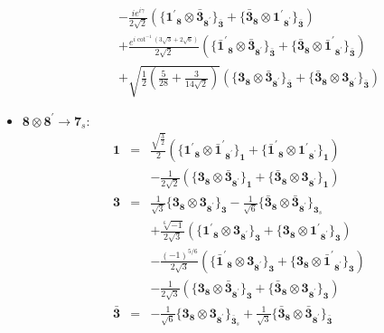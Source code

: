 \documentclass[english]{article}
\newcommand{\subcg}[3]{\big\{ {#1}\otimes{#2}\big\}^{}_{#3}}
\newcommand{\rep}[1]{\mathbf{#1}}
\begin{document}
\begin{itemize}
\begin{eqnarray*}
 & & -\frac{i e^{i \gamma }}{2 \sqrt{2}}\left(\subcg{\rep{1^{\prime}}_{\rep{8}}}{\rep{\bar{3}}_{\rep{8^{\prime}}}}{\rep{\bar{3}}}+\subcg{\rep{\bar{3}}_{\rep{8}}}{\rep{1^{\prime}}_{\rep{8^{\prime}}}}{\rep{\bar{3}}}\right) \\ 
 & & +\frac{e^{i \cot ^{-1}\left(3 \sqrt{3}+2 \sqrt{6}\right)}}{2 \sqrt{2}}\left(\subcg{\rep{\bar{1}^{\prime}}_{\rep{8}}}{\rep{\bar{3}}_{\rep{8^{\prime}}}}{\rep{\bar{3}}}+\subcg{\rep{\bar{3}}_{\rep{8}}}{\rep{\bar{1}^{\prime}}_{\rep{8^{\prime}}}}{\rep{\bar{3}}}\right) \\ 
 & & +\sqrt{\frac{1}{2} \left(\frac{5}{28}+\frac{3}{14 \sqrt{2}}\right)}\left(\subcg{\rep{3}_{\rep{8}}}{\rep{\bar{3}}_{\rep{8^{\prime}}}}{\rep{\bar{3}}}+\subcg{\rep{\bar{3}}_{\rep{8}}}{\rep{3}_{\rep{8^{\prime}}}}{\rep{\bar{3}}}\right)
\end{eqnarray*}
\item $\rep{8}\otimes\rep{8^{\prime}}\to\rep{7}_{s}$:
\begin{eqnarray*}
\rep{1} &=& \frac{\sqrt{\frac{3}{2}}}{2}\left(\subcg{\rep{1^{\prime}}_{\rep{8}}}{\rep{\bar{1}^{\prime}}_{\rep{8^{\prime}}}}{\rep{1}}+\subcg{\rep{\bar{1}^{\prime}}_{\rep{8}}}{\rep{1^{\prime}}_{\rep{8^{\prime}}}}{\rep{1}}\right) \\ 
 & & -\frac{1}{2 \sqrt{2}}\left(\subcg{\rep{3}_{\rep{8}}}{\rep{\bar{3}}_{\rep{8^{\prime}}}}{\rep{1}}+\subcg{\rep{\bar{3}}_{\rep{8}}}{\rep{3}_{\rep{8^{\prime}}}}{\rep{1}}\right)
\\
\rep{3} &=& \frac{1}{\sqrt{3}}\subcg{\rep{3}_{\rep{8}}}{\rep{3}_{\rep{8^{\prime}}}}{\rep{3}}-\frac{1}{\sqrt{6}}\subcg{\rep{\bar{3}}_{\rep{8}}}{\rep{\bar{3}}_{\rep{8^{\prime}}}}{\rep{3}_{s}} \\ 
 & & +\frac{\sqrt[6]{-1}}{2 \sqrt{3}}\left(\subcg{\rep{1^{\prime}}_{\rep{8}}}{\rep{3}_{\rep{8^{\prime}}}}{\rep{3}}+\subcg{\rep{3}_{\rep{8}}}{\rep{1^{\prime}}_{\rep{8^{\prime}}}}{\rep{3}}\right) \\ 
 & & -\frac{(-1)^{5/6}}{2 \sqrt{3}}\left(\subcg{\rep{\bar{1}^{\prime}}_{\rep{8}}}{\rep{3}_{\rep{8^{\prime}}}}{\rep{3}}+\subcg{\rep{3}_{\rep{8}}}{\rep{\bar{1}^{\prime}}_{\rep{8^{\prime}}}}{\rep{3}}\right) \\ 
 & & -\frac{1}{2 \sqrt{3}}\left(\subcg{\rep{3}_{\rep{8}}}{\rep{\bar{3}}_{\rep{8^{\prime}}}}{\rep{3}}+\subcg{\rep{\bar{3}}_{\rep{8}}}{\rep{3}_{\rep{8^{\prime}}}}{\rep{3}}\right)
\\
\rep{\bar{3}} &=& -\frac{1}{\sqrt{6}}\subcg{\rep{3}_{\rep{8}}}{\rep{3}_{\rep{8^{\prime}}}}{\rep{\bar{3}}_{s}}+\frac{1}{\sqrt{3}}\subcg{\rep{\bar{3}}_{\rep{8}}}{\rep{\bar{3}}_{\rep{8^{\prime}}}}{\rep{\bar{3}}} \\ 

\end{eqnarray*}
\end{itemize}
\end{document}
